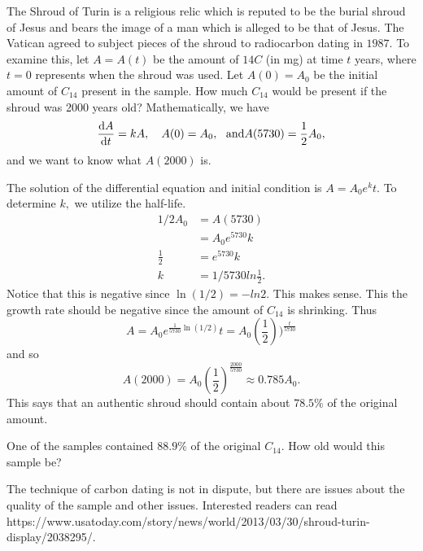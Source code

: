 \begin{myexample}
  The Shroud of Turin is a religious relic which is reputed to be the
  burial shroud of Jesus and bears the image of a man which is alleged
  to be that of Jesus.  The Vatican agreed to subject pieces of the
  shroud to radiocarbon dating in $1987.$ To examine this, let
  $A=A(t)$ be the amount of $14C$ (in mg) at time $t$ years, where $t=0$ 
  represents when the shroud was used.  Let $A(0)=A_0$ be the initial
  amount of $C_{14}$ present in the sample.  How much $C_{14}$ would be present
  if the shroud was 2000 years old?  Mathematically, we have
$$
\dfdx{A}{t}=kA,\ \ \ A(0)=A_0,\ \ \text{and}   A(5730)=\frac{1}{2} A_0,
$$
and we want to know what $A(2000)$ is.

The solution of the differential equation and initial condition is $A=A_0e^kt.$  To determine $k,$ we utilize the half-life.
\begin{align*}
  1/2 A_0&=A(5730)\\
  &=A_0 e^5730k \\
 \frac{1}{2}&=e^5730k \\
k&=1/5730 ln \frac{1}{2}.
\end{align*}
Notice that this is negative since $\ln (1/2)=-ln 2.$  This makes
sense. This the growth rate should be negative since the amount of
$C_{14}$ is shrinking.   Thus 
$$
A=A_0 e^{\frac{1}{5730}\ln (1/2) }t=A_0 \left(\frac{1}{2}\right))^\frac{t}{5730}
$$
and so
$$
A(2000)=A_0 \left(\frac{1}{2}\right)^{\frac{2000}{5730}} \approx 0.785A_0.
$$
This says that an authentic shroud should contain about $78.5\%$ of  the original amount.

\begin{embeddedproblem}{}
  One of the samples contained $88.9\%$ of the original $C_{14}.$ How
  old would this sample be?
\end{embeddedproblem}
The technique of carbon dating is not in dispute, but there are issues
about the quality of the sample and other issues.  Interested readers
can read
https://www.usatoday.com/story/news/world/2013/03/30/shroud-turin-display/2038295/.
\end{myexample}



